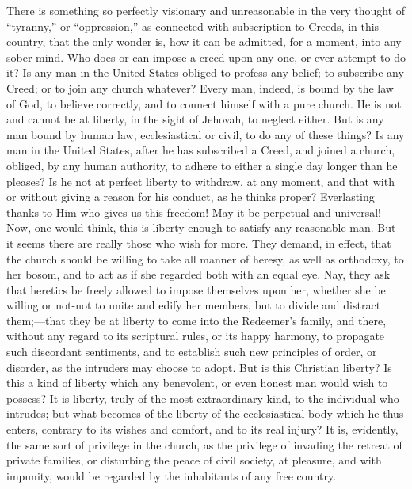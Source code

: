 \documentclass[
]{book}
\begin{document}
There is something so perfectly visionary and unreasonable in the very thought of ``tyranny,'' or ``oppression,'' as connected with subscription to Creeds, in this country, that the only wonder is, how it can be admitted, for a moment, into any sober mind. Who does or can impose a creed upon any one, or ever attempt to do it? Is any man in the United States obliged to profess any belief; to subscribe any Creed; or to join any church whatever? Every man, indeed, is bound by the law of God, to believe correctly, and to connect himself with a pure church. He is not and cannot be at liberty, in the sight of Jehovah, to neglect either. But is any man bound by human law, ecclesiastical or civil, to do any of these things? Is any man in the United States, after he has subscribed a Creed, and joined a church, obliged, by any human authority, to adhere to either a single day longer than he pleases? Is he not at perfect liberty to withdraw, at any moment, and that with or without giving a reason for his conduct, as he thinks proper? Everlasting thanks to Him who gives us this freedom! May it be perpetual and universal! Now, one would think, this is liberty enough to satisfy any reasonable man. But it seems there are really those who wish for more. They demand, in effect, that the church should be willing to take all manner of heresy, as well as orthodoxy, to her bosom, and to act as if she regarded both with an equal eye. Nay, they ask that heretics be freely allowed to impose themselves upon her, whether she be willing or not-not to unite and edify her members, but to divide and distract them;---that they be at liberty to come into the Redeemer's family, and there, without any regard to its scriptural rules, or its happy harmony, to propagate such discordant sentiments, and to establish such new principles of order, or disorder, as the intruders may choose to adopt. But is this Christian liberty? Is this a kind of liberty which any benevolent, or even honest man would wish to possess? It is liberty, truly of the most extraordinary kind, to the individual who intrudes; but what becomes of the liberty of the ecclesiastical body which he thus enters, contrary to its wishes and comfort, and to its real injury? It is, evidently, the same sort of privilege in the church, as the privilege of invading the retreat of private families, or disturbing the peace of civil society, at pleasure, and with impunity, would be regarded by the inhabitants of any free country.
\end{document}
